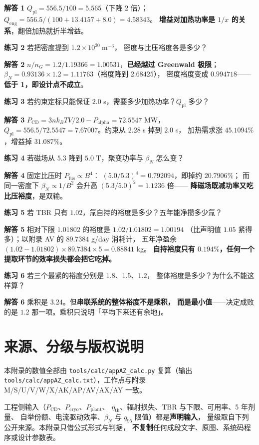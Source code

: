 \textbf{解答 1} $Q_\mathrm{pl}=556.5/100=5.565$（下降 $2$ 倍）；
$Q_\mathrm{eng}=556.5/(100+13.4157+8.0)=4.58343$。
\textbf{增益对加热功率是 $1/x$ 的关系}，翻倍加热就折半增益。

\textbf{练习 2} 若把密度提到 $1.2\times10^{20}\ \mathrm{m^{-3}}$，
密度与比压裕度各是多少？

\textbf{解答 2} $n/n_G=1.2/1.19366=1.00531$，\textbf{已经越过 Greenwald 极限}；
$\beta_N=0.93136\times1.2=1.11763$（裕度降到 $2.68425$），
密度裕度变成 $0.994718$——\textbf{低于 1，即设计点不成立}。

\textbf{练习 3} 若约束定标只能保证 $2.0$ s，需要多少加热功率？$Q_\mathrm{pl}$ 多少？

\textbf{解答 3} $P_\mathrm{CD}=3nk_BTV/2.0-P_\mathrm{alpha}=72.5547$ MW，
$Q_\mathrm{pl}=556.5/72.5547=7.67007$。约束从 $2.28$ s 掉到 $2.0$ s，
加热需求涨 $45.1094\%$，增益掉 $31.087\%$。

\textbf{练习 4} 若磁场从 $5.3$ 降到 $5.0$ T，聚变功率与 $\beta_N$ 怎么变？

\textbf{解答 4} 固定比压时 $P_\mathrm{fus}\propto B^4$：
$(5.0/5.3)^4=0.792094$，即掉约 $20.7906\%$；
而同一密度下 $\beta_N\propto1/B^2$ 会升高 $(5.3/5.0)^2=1.1236$ 倍——
\textbf{降磁场既减功率又吃比压裕度}，是双输。

\textbf{练习 5} 若 TBR 只有 $1.02$，氚自持的裕度是多少？五年能净攒多少氚？

\textbf{解答 5} 相对下限 $1.01802$ 的裕度是 $1.02/1.01802=1.00194$
（比声明值 $1.05$ 紧得多）；以附录 AV 的 $89.7384$ g/day 消耗计，
五年净盈余 $(1.02-1.01802)\times89.7384\times5=0.88841$ kg。
\textbf{自持裕度只有 $0.194\%$，任何一个提取环节的效率损失都会把它吃掉。}

\textbf{练习 6} 若三个最紧的裕度分别是 $1.8$、$1.5$、$1.2$，
整体裕度是多少？为什么不能这样算？

\textbf{解答 6} 乘积是 $3.24$。但\textbf{串联系统的整体裕度不是乘积，
而是最小值}——决定成败的是 $1.2$ 那一项。乘积只说明「平均下来还有余地」。

\section{来源、分级与版权说明}
\label{sec:app-az-source}

\begingroup\small
本附录的数值全部由 \texttt{tools/\allowbreak{}calc/\allowbreak{}appAZ\_calc.py} 复算（输出
\texttt{tools/\allowbreak{}calc/\allowbreak{}appAZ\_calc.txt}），工作点与附录 M/S/U/V/W/X/AK/AP/AV/AX/AY 一致。

工程侧输入（$P_\mathrm{CD}$、$P_\mathrm{cryo}$、$P_\mathrm{plant}$、
$\eta_\mathrm{th}$、辐射损失、TBR 与下限、可用率、5 年剂量、
自举份额、电流驱动效率、$\beta_N$ 与 $q_{95}$ 限值）都是\textbf{声明输入}，
量级取自下列公开来源。本附录只借公式形式与判据，
\textbf{不复制}任何成段文字、原图、系统码程序或设计参数表。


